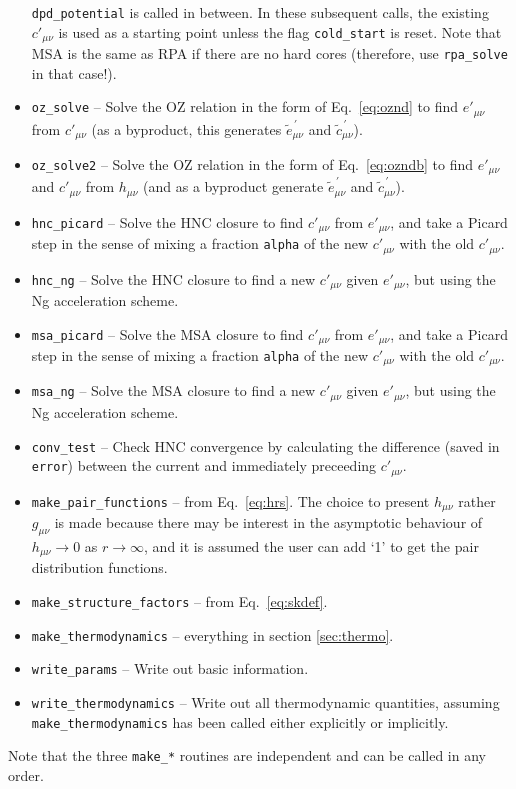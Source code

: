 \documentclass[12pt,a4paper]{article}
\newcommand{\myprime}{^{{}\,\prime}}
\newcommand{\Eqref}[1]{Eq.~\eqref{#1}}
\begin{document}
\begin{itemize}
  \verb+dpd_potential+ is called in between.  In these subsequent
  calls, the existing $c'_{\mu\nu}$ is used as a starting point unless
  the flag \verb+cold_start+ is reset.  Note that MSA is the same as
  RPA if there are no hard cores (therefore, use \verb+rpa_solve+ in
  that case!).
%
\item\verb+oz_solve+ -- Solve the OZ relation in the form of
  \Eqref{eq:oznd} to find $e'_{\mu\nu}$ from $c'_{\mu\nu}$ (as a
  byproduct, this generates ${\tilde e}_{\mu\nu}\myprime$ and ${\tilde
    c}_{\mu\nu}\myprime$).
%
\item\verb+oz_solve2+ -- Solve the OZ relation in the form of
  \Eqref{eq:ozndb} to find $e'_{\mu\nu}$ and $c'_{\mu\nu}$ from
  $h_{\mu\nu}$ (and as a byproduct generate ${\tilde
    e}_{\mu\nu}\myprime$ and ${\tilde c}_{\mu\nu}\myprime$).
%
\item\verb+hnc_picard+ -- Solve the HNC closure to find $c'_{\mu\nu}$
  from $e'_{\mu\nu}$, and take a Picard step in the sense of mixing a
  fraction \verb+alpha+ of the new $c'_{\mu\nu}$ with the old
  $c'_{\mu\nu}$.
%
\item\verb+hnc_ng+ -- Solve the HNC closure to find a new
$c'_{\mu\nu}$ given $e'_{\mu\nu}$, but using the Ng acceleration scheme.
%
\item\verb+msa_picard+ -- Solve the MSA closure to find $c'_{\mu\nu}$
  from $e'_{\mu\nu}$, and take a Picard step in the sense of mixing a
  fraction \verb+alpha+ of the new $c'_{\mu\nu}$ with the old
  $c'_{\mu\nu}$.
%
\item\verb+msa_ng+ -- Solve the MSA closure to find a new
$c'_{\mu\nu}$ given $e'_{\mu\nu}$, but using the Ng acceleration scheme.
%
\item\verb+conv_test+ -- Check HNC convergence by calculating the
  difference (saved in \verb+error+) between the current and
  immediately preceeding $c'_{\mu\nu}$.
%
\item\verb+make_pair_functions+ -- from \Eqref{eq:hrs}.  The
  choice to present $h_{\mu\nu}$ rather $g_{\mu\nu}$ is made because
  there may be interest in the asymptotic behaviour of
  $h_{\mu\nu}\to0$ as $r\to\infty$, and it is assumed the user can add
  `1' to get the pair distribution functions.
%
\item\verb+make_structure_factors+ -- from \Eqref{eq:skdef}.
%
\item\verb+make_thermodynamics+ -- everything in section
  \ref{sec:thermo}.
%
\item\verb+write_params+ -- Write out basic information.
%
\item\verb+write_thermodynamics+ -- Write out all thermodynamic
  quantities, assuming \verb+make_thermodynamics+ has been called
  either explicitly or implicitly.
%
\end{itemize}
%
Note that the three \verb+make_*+ routines are independent and can be
called in any order.
\end{document}
